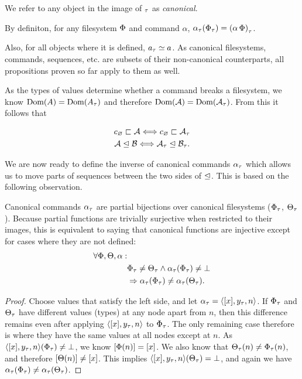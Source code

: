 We refer to any object in the image of ${}_\tau$ as \emph{canonical}.

By definiton,
for any filesystem $\Phi$ and command $\alpha$, 
${\alpha}_\tau({\Phi}_\tau) = {(\alpha\,\Phi)}_\tau$.


Also, for all objects where it is defined, ${a}_\tau\simeq a$.
As canonical filesystems, commands, sequences, etc.
are subsets of their non-canonical counterparts, 
all propositions proven so far apply to them as well.


As the types of values determine whether a command breaks a filesystem,
we know $\textrm{Dom}({A})=\textrm{Dom}({{A}_\tau})$ and therefore $\textrm{Dom}({\mathcal{A}})=\textrm{Dom}({{\mathcal{A}}_\tau})$.
From this it follows that
\begin{mycor}
\begin{gather*}
c_\varnothing\sqsubset{\mathcal{A}} \Longleftrightarrow c_\varnothing\sqsubset{{\mathcal{A}}_\tau} \\
{\mathcal{A}}\trianglelefteq{\mathcal{B}} \Longleftrightarrow {{\mathcal{A}}_\tau}\trianglelefteq{{\mathcal{B}}_\tau}.
\end{gather*}
\end{mycor}


We are now ready to define the inverse of canonical commands ${\alpha}_\tau$
which allows us to move parts of sequences between the
two sides of $\trianglelefteq$.
This is based on the following observation.

\begin{mylem}
Canonical commands ${\alpha}_\tau$ are partial bijections over canonical filesystems
(${\Phi}_\tau$, ${\Theta}_\tau$).
Because partial functions are trivially surjective when restricted to their images, this is
equivalent to saying that canonical functions are injective except for cases
where they are not defined:
\begin{align*}
\forall\Phi,\Theta,\alpha:& \\
& {\Phi}_\tau\neq{\Theta}_\tau \wedge {\alpha}_\tau({\Phi}_\tau)\neq\bot \\
& \Rightarrow {\alpha}_\tau({\Phi}_\tau) \neq {\alpha}_\tau({\Theta}_\tau).
\end{align*}
\end{mylem}
\begin{proof}
Choose values that satisfy the left side, and let ${\alpha}_\tau = \langle{[{x}],{y}_\tau,{n}}\rangle$.
If ${\Phi}_\tau$ and ${\Theta}_\tau$ have different values (types) at any node apart from $n$, then this difference remains
even after applying $\langle{[{x}],{y}_\tau,{n}}\rangle$ to ${\Phi}_\tau$. 
The only remaining case therefore is where they have the same values
at all nodes except at $n$.
As $\langle{[{x}],{y}_\tau,{n}}\rangle({\Phi}_\tau)\neq\bot$, we know $[\Phi(n)]=[x]$.
We also know that ${\Theta}_\tau(n)\neq{\Phi}_\tau(n)$, and therefore
$[\Theta(n)]\neq[x]$.
This implies $\langle{[{x}],{y}_\tau,{n}}\rangle({\Theta}_\tau)=\bot$,
and again we have ${\alpha}_\tau({\Phi}_\tau) \neq {\alpha}_\tau({\Theta}_\tau)$.
\end{proof}

